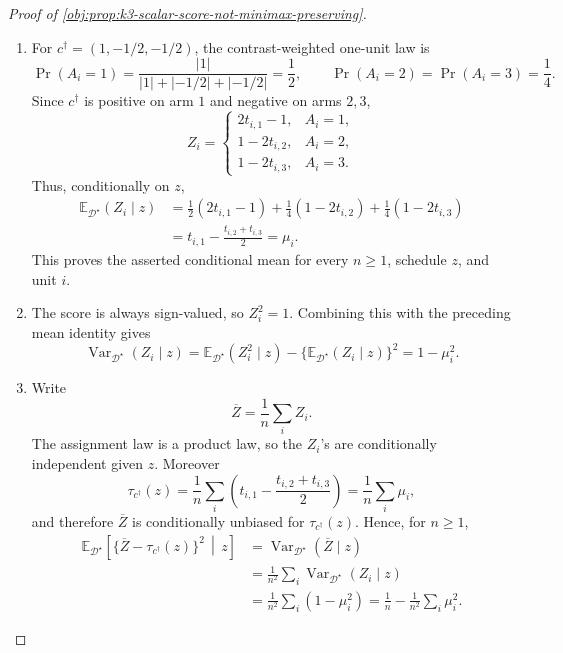 \begin{proof}[Proof of \cref{obj:prop:k3-scalar-score-not-minimax-preserving}]
\begin{enumerate}
\item
For \(c^\dagger=(1,-1/2,-1/2)\), the contrast-weighted one-unit law is
\[
\Pr(A_i=1)=\frac{|1|}{|1|+|-1/2|+|-1/2|}=\frac12,
\qquad
\Pr(A_i=2)=\Pr(A_i=3)=\frac14 .
\]
Since \(c^\dagger\) is positive on arm \(1\) and negative on arms \(2,3\),
\[
Z_i=
\begin{cases}
 2t_{i,1}-1, & A_i=1,\\
 1-2t_{i,2}, & A_i=2,\\
 1-2t_{i,3}, & A_i=3.
\end{cases}
\]
Thus, conditionally on \(z\),
\[
\begin{aligned}
\mathbb E_{\mathcal D^\star}(Z_i\mid z)
&=\frac12(2t_{i,1}-1)+\frac14(1-2t_{i,2})
  +\frac14(1-2t_{i,3})  \\
&=t_{i,1}-\frac{t_{i,2}+t_{i,3}}2
=\mu_i .
\end{aligned}
\]
This proves the asserted conditional mean for every \(n\ge1\), schedule \(z\), and unit \(i\). %

\item
The score is always sign-valued, so \(Z_i^2=1\). Combining this with the preceding mean identity gives
\[
\operatorname{Var}_{\mathcal D^\star}(Z_i\mid z)
=\mathbb E_{\mathcal D^\star}(Z_i^2\mid z)
-\{\mathbb E_{\mathcal D^\star}(Z_i\mid z)\}^2
=1-\mu_i^2 .
\]

\item
Write
\[
\overline Z=\frac1n\sum_i Z_i .
\]
The assignment law is a product law, so the \(Z_i\)'s are conditionally independent given \(z\). Moreover
\[
\tau_{c^\dagger}(z)
=\frac1n\sum_i\left(t_{i,1}-\frac{t_{i,2}+t_{i,3}}2\right)
=\frac1n\sum_i\mu_i ,
\]
and therefore \(\overline Z\) is conditionally unbiased for \(\tau_{c^\dagger}(z)\). Hence, for \(n\ge1\),
\[
\begin{aligned}
\mathbb E_{\mathcal D^\star}\!\left[
\{\overline Z-\tau_{c^\dagger}(z)\}^2\,\middle|\,z\right]
&=\operatorname{Var}_{\mathcal D^\star}(\overline Z\mid z)  \\
&=\frac1{n^2}\sum_i \operatorname{Var}_{\mathcal D^\star}(Z_i\mid z)\\
&=\frac1{n^2}\sum_i(1-\mu_i^2)
=\frac1n-\frac1{n^2}\sum_i\mu_i^2 .
\end{aligned}
\]


\end{enumerate}
\end{proof}

